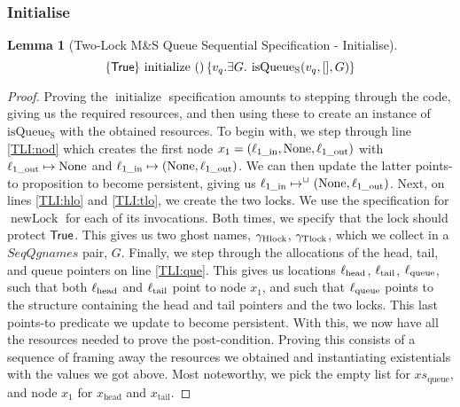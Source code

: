 \documentclass[a4paper, 10pt]{report}
\theoremstyle{definition}
\newtheorem{lemma}[theorem]{Lemma}
\newcommand{\newLock}{\operatorname{newLock}}
\newcommand{\initialise}{\operatorname{initialize}}
\newcommand{\msq}{M\&S Queue}
\newcommand{\tlmsq}{Two-Lock \msq{}}
\newcommand{\isqueueseq}{\operatorname{isQueue_{S}}}
\newcommand{\SeqQgnames}{SeqQgnames}
\newcommand{\vq}{v_q}
\newcommand{\xsqueue}{xs_{\mathrm{queue}}}
\newcommand{\locinM}[1]{\loc_{#1\_\mathrm{in}}}
\newcommand{\locoutM}[1]{\loc_{#1\_\mathrm{out}}}
\newcommand{\locN}[1]{\loc_{\mathrm{#1}}}
\newcommand{\lochead}{\locN{head}}
\newcommand{\loctail}{\locN{tail}}
\newcommand{\locqueue}{\locN{queue}}
\newcommand{\node}{x}
\newcommand{\nodeM}[1]{\node_{#1}}
\newcommand{\nodeN}[1]{\node_{\mathrm{#1}}}
\newcommand{\nodehead}{\nodeN{head}}
\newcommand{\nodetail}{\nodeN{tail}}
\newcommand{\Qg}{G}
\newcommand{\ghlock}{\gname_{\mathrm{Hlock}}}
\newcommand{\gtlock}{\gname_{\mathrm{Tlock}}}
\newcommand{\seqspecinitHTGen}[2]{\hoare{\TRUE}{\initialise \ \TT}{#1 . \Exists #2. \isqueueseq(#1, [], #2)}}
\newcommand{\seqspecinitGen}[2]{\seqspecinitHTGen{#1}{#2}}
\newcommand{\seqspecinit}{\seqspecinitGen{\vq}{\Qg}}
\begin{document}
\subsubsection{Initialise}
\begin{lemma}[\tlmsq{} Sequential Specification - Initialise]\label{TLMSQ:spec:seq:init}
  \begin{equation*}
    \seqspecinit
  \end{equation*}
\end{lemma}
\begin{proof}
Proving the $\initialise$ specification amounts to stepping through the code, giving us the required resources, and then using these to create an instance of $\isqueueseq$ with the obtained resources. To begin with, we step through line \ref{TLI:nod} which creates the first node $\nodeM{1} = (\locinM{1}, \None, \locoutM{1})$ with $\locoutM{1} \mapsto \None$ and $\locinM{1} \mapsto (\None, \locoutM{1})$. We can then update the latter points-to proposition to become persistent, giving us $\locinM{1} \mapsto^{\persistently} (\None, \locoutM{1})$. Next, on lines \ref{TLI:hlo} and \ref{TLI:tlo}, we create the two locks. We use the specification for $\newLock$ for each of its invocations. Both times, we specify that the lock should protect $\textsf{True}$. This gives us two ghost names, $\ghlock$, $\gtlock$, which we collect in a $\SeqQgnames$ pair, $\Qg$.
Finally, we step through the allocations of the head, tail, and queue pointers on line \ref{TLI:que}. This gives us locations $\lochead$, $\loctail$, $\locqueue$, such that both $\lochead$ and $\loctail$ point to node $\nodeM{1}$, and such that $\locqueue$ points to the structure containing the head and tail pointers and the two locks. This last points-to predicate we update to become persistent.
With this, we now have all the resources needed to prove the post-condition. Proving this consists of a sequence of framing away the resources we obtained and instantiating existentials with the values we got above. Most noteworthy, we pick the empty list for $\xsqueue$, and node $\nodeM{1}$ for $\nodehead$ and $\nodetail$.
\end{proof}
\end{document}
